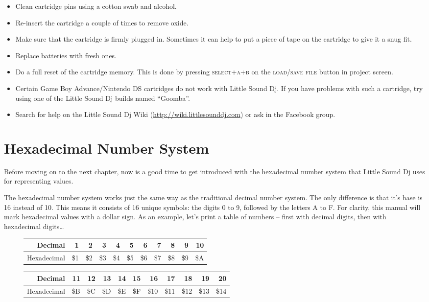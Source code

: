 \begin{itemize}
\item Clean cartridge pins using a cotton swab and alcohol.
\item Re-insert the cartridge a couple of times to remove oxide.
\item Make sure that the cartridge is firmly plugged in. Sometimes it can help to put a piece of tape on the cartridge to give it a snug fit.
\item Replace batteries with fresh ones.
\item Do a full reset of the cartridge memory. This is done by pressing \textsc{select+a+b} on the \textsc{load/save file} button in project screen.
\item Certain Game Boy Advance/Nintendo DS cartridges do not work with Little Sound Dj. If you have problems with such a cartridge, try using one of the Little Sound Dj builds named ``Goomba''.
\item Search for help on the Little Sound Dj Wiki (\url{http://wiki.littlesounddj.com}) or ask in the Facebook group.
\end{itemize}

\section{Hexadecimal Number System}

Before moving on to the next chapter, now is a good time to get introduced with the hexadecimal number system that Little Sound Dj uses for representing values.

The hexadecimal number system works just the same way as the traditional decimal number system. The only difference is that it's base is 16 instead of 10. This means it consists of 16 unique symbols: the digits 0 to 9, followed by the letters A to F. For clarity, this manual will mark hexadecimal values with a dollar sign.
As an example, let's print a table of numbers -- first with decimal digits, then with
hexadecimal digits\ldots

\begin{figure}[hbtp]
\centering

\begin{tabular}{r|r|r|r|r|r|r|r|r|r|r}
 Decimal & 1 & 2 & 3 & 4 & 5 & 6 & 7 & 8 & 9 & 10 \\
\hline
 Hexadecimal & \$1 & \$2 & \$3 & \$4 & \$5 & \$6 & \$7 & \$8 & \$9 & \$A \\
\end{tabular}

\begin{tabular}{r|r|r|r|r|r|r|r|r|r|r}
 Decimal & 11 & 12 & 13 & 14 & 15 & 16 & 17 & 18 & 19 & 20 \\
\hline
 Hexadecimal & \$B & \$C & \$D & \$E & \$F & \$10 & \$11 & \$12 & \$13 & \$14  \\
\end{tabular}

\end{figure}

